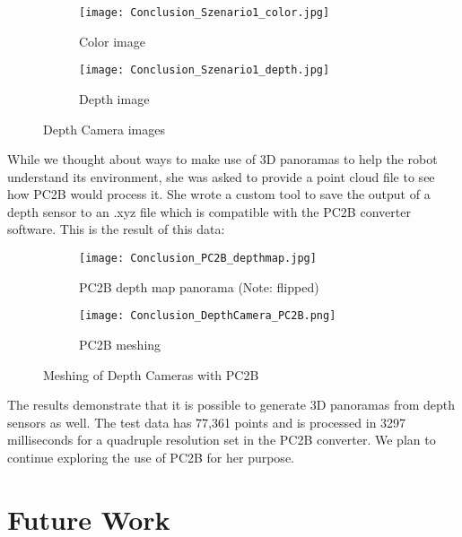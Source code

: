 \begin{figure}[h]
	\centering
	\begin{subfigure}[b]{0.49\textwidth}
		\centering
		\texttt{[image: Conclusion\_Szenario1\_color.jpg]}
		\caption{Color image}
		\label{fig:conclusion_depth_camera_color}
	\end{subfigure}
	\hfill
	\begin{subfigure}[b]{0.49\textwidth}
		\centering
		\texttt{[image: Conclusion\_Szenario1\_depth.jpg]}
		\caption{Depth image}
		\label{fig:conclusion_depth_camera_depth}
	\end{subfigure}
	\caption{Depth Camera images}
	\label{fig:conclusion_depth_camera_images}
\end{figure}

While we thought about ways to make use of 3D panoramas to help the robot understand its environment, she was asked to provide a point cloud file to see how PC2B would process it. She wrote a custom tool to save the output of a depth sensor to an .xyz file which is compatible with the PC2B converter software. This is the result of this data:\\

\begin{figure}[h]
	\centering
	\begin{subfigure}[b]{0.54\textwidth}
		\centering
		\texttt{[image: Conclusion\_PC2B\_depthmap.jpg]}
		\caption{PC2B depth map panorama (Note: flipped)}
		\label{fig:conclusion_depth_camera_pc2b_panorama}
	\end{subfigure}
	\hfill
	\begin{subfigure}[b]{0.45\textwidth}
		\centering
		\texttt{[image: Conclusion\_DepthCamera\_PC2B.png]}
		\caption{PC2B meshing}
		\label{fig:conclusion_depth_camera_pc2b_meshing}
	\end{subfigure}
	\caption{Meshing of Depth Cameras with PC2B}
	\label{fig:conclusion_depth_camera_meshing}
\end{figure}




The results demonstrate that it is possible to generate 3D panoramas from depth sensors as well. The test data has 77,361 points and is processed in 3297 milliseconds for a quadruple resolution set in the PC2B converter. We plan to continue exploring the use of PC2B for her purpose.


\section{Future Work}


